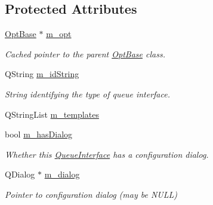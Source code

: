 \subsection*{Protected Attributes}
\begin{DoxyCompactItemize}
\item 
\hypertarget{classGlobalSearch_1_1QueueInterface_aadfac830d9d1551ceb3d4c80937c9b9e}{\hyperlink{classGlobalSearch_1_1OptBase}{Opt\-Base} $\ast$ \hyperlink{classGlobalSearch_1_1QueueInterface_aadfac830d9d1551ceb3d4c80937c9b9e}{m\-\_\-opt}}\label{classGlobalSearch_1_1QueueInterface_aadfac830d9d1551ceb3d4c80937c9b9e}

\begin{DoxyCompactList}\small\item\em Cached pointer to the parent \hyperlink{classGlobalSearch_1_1OptBase}{Opt\-Base} class. \end{DoxyCompactList}\item 
\hypertarget{classGlobalSearch_1_1QueueInterface_a695d33f6164f7d83cbe6e0b6d3c5b730}{Q\-String \hyperlink{classGlobalSearch_1_1QueueInterface_a695d33f6164f7d83cbe6e0b6d3c5b730}{m\-\_\-id\-String}}\label{classGlobalSearch_1_1QueueInterface_a695d33f6164f7d83cbe6e0b6d3c5b730}

\begin{DoxyCompactList}\small\item\em String identifying the type of queue interface. \end{DoxyCompactList}\item 
Q\-String\-List \hyperlink{classGlobalSearch_1_1QueueInterface_afbece4079dfba7a2cf11c32153c777a7}{m\-\_\-templates}
\item 
\hypertarget{classGlobalSearch_1_1QueueInterface_a81933da94485f46aec4263172eaf604f}{bool \hyperlink{classGlobalSearch_1_1QueueInterface_a81933da94485f46aec4263172eaf604f}{m\-\_\-has\-Dialog}}\label{classGlobalSearch_1_1QueueInterface_a81933da94485f46aec4263172eaf604f}

\begin{DoxyCompactList}\small\item\em Whether this \hyperlink{classGlobalSearch_1_1QueueInterface}{Queue\-Interface} has a configuration dialog. \end{DoxyCompactList}\item 
\hypertarget{classGlobalSearch_1_1QueueInterface_ae7485212b5aa09c35ec6b1fbfadfeb5d}{Q\-Dialog $\ast$ \hyperlink{classGlobalSearch_1_1QueueInterface_ae7485212b5aa09c35ec6b1fbfadfeb5d}{m\-\_\-dialog}}\label{classGlobalSearch_1_1QueueInterface_ae7485212b5aa09c35ec6b1fbfadfeb5d}

\begin{DoxyCompactList}\small\item\em Pointer to configuration dialog (may be N\-U\-L\-L) \end{DoxyCompactList}\end{DoxyCompactItemize}


